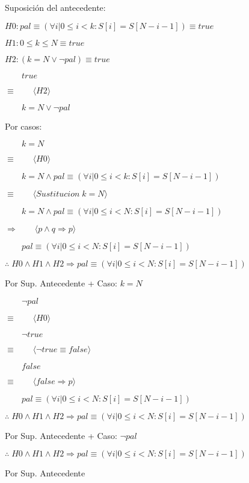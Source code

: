 \documentclass{article}
\begin{document}
Suposición del antecedente: 
\begin{framed}
$H0: pal \equiv (\forall i | 0 \leq i < k : S[i]=S[N-i-1]) \equiv true$ \par
$H1: 0 \leq k \leq N \equiv true$ \par 
$H2: (k=N \lor \neg pal) \equiv true$ \par 

\begin{framed}
$\qquad true$\par 
$\equiv  \qquad \langle H2 \rangle$\par 
$\qquad k=N \lor \neg pal$

Por casos:

\begin{framed}
$\qquad k=N$ \par 
$\equiv  \qquad \langle H0 \rangle$\par 
$\qquad k=N \land pal \equiv (\forall i | 0 \leq i < k : S[i]=S[N-i-1])$ \par 
$\equiv  \qquad \langle Sustitucion \; k=N \rangle$\par 
$\qquad k=N \land pal \equiv (\forall i | 0 \leq i < N : S[i]=S[N-i-1])$ \par 
$\Rightarrow  \qquad \langle p \land q \Rightarrow p \rangle$\par 
$\qquad pal \equiv (\forall i | 0 \leq i < N : S[i]=S[N-i-1])$ \par 
$ \therefore \; H0 \land H1 \land H2 \Rightarrow pal \equiv (\forall i | 0 \leq i < N : S[i]=S[N-i-1])$\par 
Por Sup. Antecedente + Caso: $k=N$
\end{framed}
\begin{framed}
$\qquad \neg pal$ \par 
$\equiv  \qquad \langle H0 \rangle$\par 
$\qquad \neg true$ \par
$\equiv  \qquad \langle \neg true \equiv false \rangle$\par 
$\qquad false $ \par
$\equiv  \qquad \langle false \Rightarrow p \rangle$\par 
$\qquad pal \equiv (\forall i | 0 \leq i < N : S[i]=S[N-i-1]) $ \par 
$ \therefore \; H0 \land H1 \land H2 \Rightarrow pal \equiv (\forall i | 0 \leq i < N : S[i]=S[N-i-1])$\par 
Por Sup. Antecedente + Caso: $\neg pal$
\end{framed}
\end{framed}
$ \therefore \; H0 \land H1 \land H2 \Rightarrow pal \equiv (\forall i | 0 \leq i < N : S[i]=S[N-i-1])$\par 
Por Sup. Antecedente
\end{framed}
\end{document}
